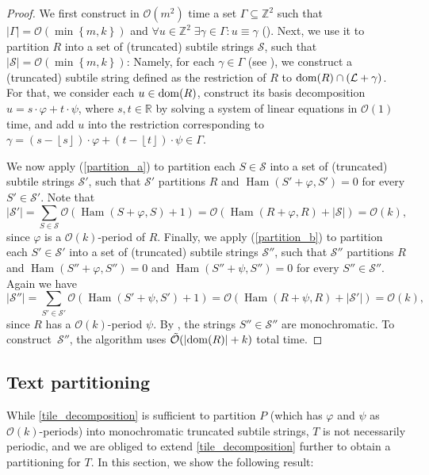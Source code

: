 \documentclass[twoside,leqno]{article}
\newcommand{\R}{\mathbb{R}}
\newcommand{\Z}{\mathbb{Z}}
\renewcommand{\O}{\mathcal{O}}
\newcommand{\tO}{\tilde{\mathcal{O}}}
\renewcommand{\S}{\mathcal{S}}
\renewcommand{\L}{\mathcal{L}}
\renewcommand{\phi}{\varphi}
\newcommand{\floor}[1]{\left\lfloor #1 \right\rfloor}
\newcommand{\set}[1]{\left\lbrace #1 \right\rbrace}
\DeclareMathOperator*{\Ham}{Ham}
\newcommand{\absolute}[1]{\left\lvert#1\right\rvert}
\begin{document}
\restateThmTileDecomposition
\begin{proof}
We first construct in $\O(m^2)$ time a set $\Gamma \subseteq \Z^2$ such that $\absolute{\Gamma} = \O(\min\set{m, k})$ and $\forall u \in \Z^2 \; \exists \gamma \in \Gamma : u \equiv \gamma$ (). Next, we use it to partition $R$ into a set of (truncated) subtile strings $\S$, such that $\absolute{\S} = \O(\min\set{m, k})$: Namely, for each $\gamma \in \Gamma$ (see ), we construct a (truncated) subtile string defined as the restriction of $R$ to $\d{R} \cap (\L + \gamma)$. For that, we consider each $u \in \operatorname*{dom}(R)$, construct its basis decomposition $u = s\cdot \phi + t\cdot \psi$, where $s,t\in \R$ by solving a system of linear equations in $\O(1)$ time, and add $u$ into the restriction corresponding to $\gamma = (s-\floor{s}) \cdot \phi + (t-\floor{t}) \cdot \psi \in \Gamma$. 

	We now apply  (\ref{partition_a}) to partition each $S \in \S$  into a set of (truncated) subtile strings $\S'$, such that $\S'$ partitions $R$ and $\Ham(S' + \phi, S') = 0$ for every $S' \in \S'$.
	Note that
	\[ \absolute{\S'} = \sum_{S \in \S} \O(\Ham(S + \phi, S) + 1) = \O(\Ham(R + \phi, R) + \absolute{\S}) = \O(k),\]
	since $\phi$ is a $\O(k)$-period of $R$.
	Finally, we apply   (\ref{partition_b}) to partition each $S' \in \S'$ into a set of (truncated) subtile strings $\S''$, such that $\S''$ partitions $R$ and $\Ham(S'' + \phi, S'') = 0$ and $\Ham(S'' + \psi, S'') = 0$ for every $S'' \in \S''$.
	Again we have
	\[ \absolute{\S''} = \sum_{S' \in \S'} \O(\Ham(S' + \psi, S') + 1) = \O(\Ham(R + \psi, R) + \absolute{\S'}) = \O(k),\]
	since $R$ has a $\O(k)$-period $\psi$.
	By , the strings $S'' \in \S''$ are monochromatic.
	To construct~$\S''$, the algorithm uses $\tO(\absolute{\d{R}} + k)$ total time.
\end{proof}


\subsection{Text partitioning}
While \cref{tile_decomposition} is sufficient to partition $P$ (which has $\phi$ and $\psi$ as $\O(k)$-periods) into monochromatic truncated subtile strings, $T$ is not necessarily periodic, and we are obliged to extend \cref{tile_decomposition} further to obtain a partitioning for $T$. In this section, we show the following result:
\end{document}
